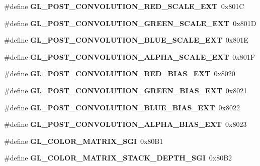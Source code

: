 \begin{DoxyCompactItemize}
\item 
\#define {\bfseries G\+L\+\_\+\+P\+O\+S\+T\+\_\+\+C\+O\+N\+V\+O\+L\+U\+T\+I\+O\+N\+\_\+\+R\+E\+D\+\_\+\+S\+C\+A\+L\+E\+\_\+\+E\+X\+T}~0x801\+C\label{_s_d_l__opengl_8h_af82b1b23c812abd694889a8c8c8350ec}

\item 
\#define {\bfseries G\+L\+\_\+\+P\+O\+S\+T\+\_\+\+C\+O\+N\+V\+O\+L\+U\+T\+I\+O\+N\+\_\+\+G\+R\+E\+E\+N\+\_\+\+S\+C\+A\+L\+E\+\_\+\+E\+X\+T}~0x801\+D\label{_s_d_l__opengl_8h_ac5c1787c53b8ae362b1ad9ffc48e7855}

\item 
\#define {\bfseries G\+L\+\_\+\+P\+O\+S\+T\+\_\+\+C\+O\+N\+V\+O\+L\+U\+T\+I\+O\+N\+\_\+\+B\+L\+U\+E\+\_\+\+S\+C\+A\+L\+E\+\_\+\+E\+X\+T}~0x801\+E\label{_s_d_l__opengl_8h_a0f478556904d63d5ba8f641477d058bd}

\item 
\#define {\bfseries G\+L\+\_\+\+P\+O\+S\+T\+\_\+\+C\+O\+N\+V\+O\+L\+U\+T\+I\+O\+N\+\_\+\+A\+L\+P\+H\+A\+\_\+\+S\+C\+A\+L\+E\+\_\+\+E\+X\+T}~0x801\+F\label{_s_d_l__opengl_8h_ac7ae2cf65b441f57fe4389e67cd9debe}

\item 
\#define {\bfseries G\+L\+\_\+\+P\+O\+S\+T\+\_\+\+C\+O\+N\+V\+O\+L\+U\+T\+I\+O\+N\+\_\+\+R\+E\+D\+\_\+\+B\+I\+A\+S\+\_\+\+E\+X\+T}~0x8020\label{_s_d_l__opengl_8h_a3cdab3cd7758e5580bfaeb9bb013dd6d}

\item 
\#define {\bfseries G\+L\+\_\+\+P\+O\+S\+T\+\_\+\+C\+O\+N\+V\+O\+L\+U\+T\+I\+O\+N\+\_\+\+G\+R\+E\+E\+N\+\_\+\+B\+I\+A\+S\+\_\+\+E\+X\+T}~0x8021\label{_s_d_l__opengl_8h_af3d90c54dacceb622447e22800640328}

\item 
\#define {\bfseries G\+L\+\_\+\+P\+O\+S\+T\+\_\+\+C\+O\+N\+V\+O\+L\+U\+T\+I\+O\+N\+\_\+\+B\+L\+U\+E\+\_\+\+B\+I\+A\+S\+\_\+\+E\+X\+T}~0x8022\label{_s_d_l__opengl_8h_a8a2778a1baaff61c1e9ab5ad90be4546}

\item 
\#define {\bfseries G\+L\+\_\+\+P\+O\+S\+T\+\_\+\+C\+O\+N\+V\+O\+L\+U\+T\+I\+O\+N\+\_\+\+A\+L\+P\+H\+A\+\_\+\+B\+I\+A\+S\+\_\+\+E\+X\+T}~0x8023\label{_s_d_l__opengl_8h_a9ee5b7a0ca198787ce18493eec857ad7}

\item 
\#define {\bfseries G\+L\+\_\+\+C\+O\+L\+O\+R\+\_\+\+M\+A\+T\+R\+I\+X\+\_\+\+S\+G\+I}~0x80\+B1\label{_s_d_l__opengl_8h_a1e5816df1feffec4ce29837ecd142537}

\item 
\#define {\bfseries G\+L\+\_\+\+C\+O\+L\+O\+R\+\_\+\+M\+A\+T\+R\+I\+X\+\_\+\+S\+T\+A\+C\+K\+\_\+\+D\+E\+P\+T\+H\+\_\+\+S\+G\+I}~0x80\+B2\label{_s_d_l__opengl_8h_a9b94dba68e49844834420611b5f7117b}


\end{DoxyCompactItemize}
